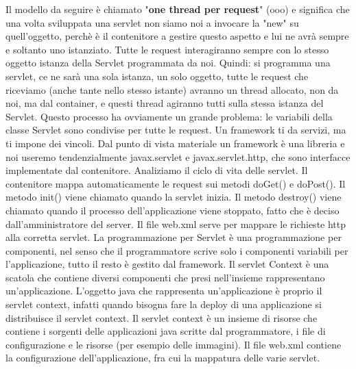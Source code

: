 Il modello da seguire è chiamato "\textbf{one thread per request}" (ooo) e significa che una volta sviluppata una servlet non siamo noi a invocare la "new" su quell'oggetto, perchè è il contenitore a gestire questo aspetto e lui ne avrà sempre e soltanto uno istanziato. Tutte le request interagiranno sempre con lo stesso oggetto istanza della Servlet programmata da noi.\newline
Quindi: si programma una servlet, ce ne sarà una sola istanza, un solo oggetto, tutte le request che riceviamo (anche tante nello stesso istante) avranno un thread allocato, non da noi, ma dal container, e questi thread agiranno tutti sulla stessa istanza del Servlet.\newline
Questo processo ha ovviamente un grande problema: le variabili della classe Servlet sono condivise per tutte le request.\newline
\newline
Un framework ti da servizi, ma ti impone dei vincoli.\newline
\newline
Dal punto di vista materiale un framework è una libreria e noi useremo tendenzialmente javax.servlet e javax.servlet.http, che sono interfacce implementate dal contenitore.\newline
\newline
Analiziamo il ciclo di vita delle servlet. \newline
Il contenitore mappa automaticamente le request sui metodi doGet() e doPost().\newline
Il metodo init() viene chiamato quando la servlet inizia.
Il metodo destroy() viene chiamato quando il processo dell'applicazione viene stoppato, fatto che è deciso dall'amministratore del server.\newline
\newline
Il file web.xml serve per mappare le richieste http alla corretta servlet.\newline
\newline
La programmazione per Servlet è una programmazione per componenti, nel senso che il programmatore scrive solo i componenti variabili per l'applicazione, tutto il resto è gestito dal framework.\newline
\newline
Il servlet Context è una scatola che contiene diversi componenti che presi nell'insieme rappresentano un'applicazione. L'oggetto java che rappresenta un'applicazione è proprio il servlet context, infatti quando bisogna fare la deploy di una applicazione si distribuisce il servlet context. Il servlet context è un insieme di risorse che contiene i sorgenti delle applicazioni java scritte dal programmatore, i file di configurazione e le risorse (per esempio delle immagini).\newline
\newline
Il file web.xml contiene la configurazione dell'applicazione, fra cui la mappatura delle varie servlet.
\newline
\newline